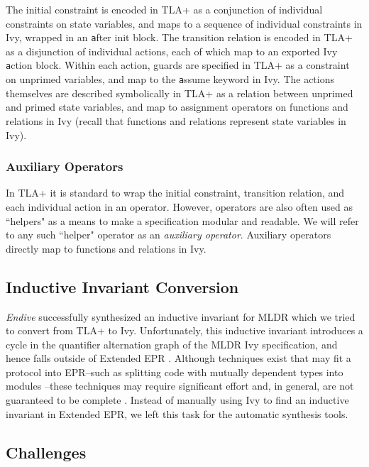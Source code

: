\documentclass[12pt]{article}
\newcommand{\ivy}[1]{{\small\texttt #1}}
\begin{document}
The initial constraint is encoded in TLA+ as a conjunction of individual constraints on state variables, and maps to a sequence of individual constraints in Ivy, wrapped in an \ivy{after init} block.  The transition relation is encoded in TLA+ as a disjunction of individual actions, each of which map to an exported Ivy \ivy{action} block.  Within each action, guards are specified in TLA+ as a constraint on unprimed variables, and map to the \ivy{assume} keyword in Ivy.  The actions themselves are described symbolically in TLA+ as a relation between unprimed and primed state variables, and map to assignment operators on functions and relations in Ivy (recall that functions and relations represent state variables in Ivy).

\subsubsection{Auxiliary Operators}

In TLA+ it is standard to wrap the initial constraint, transition relation, and each individual action in an operator.  However, operators are also often used as ``helpers" as a means to make a specification modular and readable.  We will refer to any such ``helper" operator as an \textit{auxiliary operator}.  Auxiliary operators directly map to functions and relations in Ivy.

\subsection{Inductive Invariant Conversion}

\textit{Endive} successfully synthesized an inductive invariant for MLDR which we tried to convert from TLA+ to Ivy.  Unfortunately, this inductive invariant introduces a cycle in the quantifier alternation graph of the MLDR Ivy specification, and hence falls outside of Extended EPR \cite{padonpaxosEPR}.  Although techniques exist that may fit a protocol into EPR--such as splitting code with mutually dependent types into modules \cite{McMillan2018DeductiveVI}--these techniques may require significant effort and, in general, are not guaranteed to be complete \cite{padonpaxosEPR}.  Instead of manually using Ivy to find an inductive invariant in Extended EPR, we left this task for the automatic synthesis tools.

\subsection{Challenges}
\end{document}
